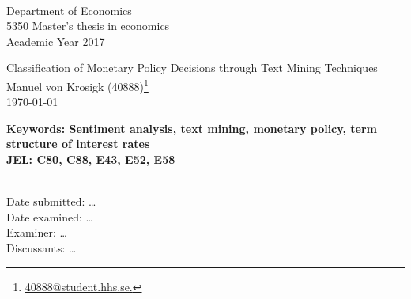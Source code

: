 
	\\
	Department of Economics\\
	5350 Master’s thesis in economics\\
	Academic Year 2017\\

	\vspace{1cm}	
	\begin{centering}
		\Large{Classification of Monetary Policy Decisions through Text Mining Techniques}\\
		\vspace{.5cm}	
		\large{Manuel von Krosigk (40888)}\footnote{\href{mailto:40888@student.hhs.se}{40888@student.hhs.se.}}\\
		\vspace{.5cm}	
		\large{\today}\\
	\end{centering}	
	\begin{abstract}
		\dots%
	\end{abstract}
	\textbf{Keywords: Sentiment analysis, text mining, monetary policy, term structure of interest rates}
	\\\textbf{JEL: C80, C88, E43, E52, E58} %
	
	\vfill
	\\Date submitted: \dots
	\\Date examined: \dots
	\\Examiner: \dots
	\\Discussants: \dots